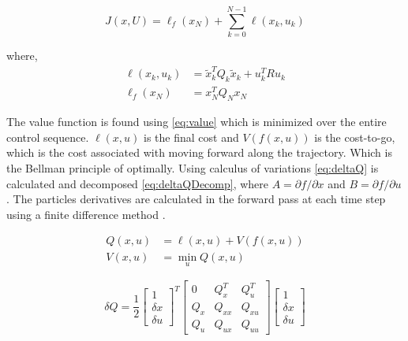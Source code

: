 \begin{equation}
    J(x,U) = \ell_f (x_N) + \sum_{k=0}^{N-1} \ell(x_k, u_k) 
    \label{eq:cost}
\end{equation}

where,
\begin{equation}
    \begin{split}
            \ell(x_k, u_k) &= \tilde{x}_k^T Q_k \tilde{x}_k + u_k^T R u_k \\
    \ell_f(x_N) &= x^{T}_{N} Q_N x_{N}
    \end{split}
      \label{eq:mycost}
\end{equation}

The value function is found using \autoref{eq:value} which is minimized over the entire control sequence. $\ell (x,u)$ is the final cost and $V(f(x,u))$ is the cost-to-go, which is the cost associated with moving forward along the trajectory. Which is the Bellman principle of optimally. Using calculus of variations \autoref{eq:deltaQ} is calculated and decomposed \autoref{eq:deltaQDecomp}, where $ A =\partial f / \partial x$ and  $B = \partial f / \partial u$.  The particles derivatives are calculated in the forward pass at each time step using a finite difference method \cite{iLQR_Zachary2016}. 


\begin{equation}
    \begin{split}
        Q(x,u) &= \ell (x,u) + V(f(x,u)) \\
        V(x,u) &= \min\limits_{u} Q(x,u)
    \end{split}
    \label{eq:value}
\end{equation}


\begin{equation}
     \delta Q = 
     \frac{1}{2}
     \begin{bmatrix}
     1 \\
     \delta x \\
     \delta u
     \end{bmatrix}^T
       \begin{bmatrix}
        0       & Q^T_{x} & Q^T_{u}  \\
        Q_{x}   & Q_{xx} & Q_{xu}  \\
        Q_{u}   & Q_{ux} & Q_{uu} 
    \end{bmatrix}
    \begin{bmatrix}
     1 \\
     \delta x \\
     \delta u
     \end{bmatrix}
        \label{eq:deltaQ}
\end{equation}

